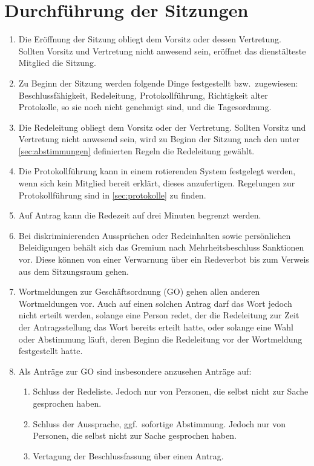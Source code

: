 \section{Durchführung der Sitzungen}
\label{sec:Sitzungen}
\begin{enumerate}
	\item Die Eröffnung der Sitzung obliegt dem Vorsitz oder dessen Vertretung.
	Sollten Vorsitz und Vertretung nicht anwesend sein, eröffnet das dienstälteste Mitglied die Sitzung.
	\item Zu Beginn der Sitzung werden folgende Dinge festgestellt bzw.\ zugewiesen: Beschlussfähigkeit, Redeleitung, Protokollführung, Richtigkeit alter Protokolle, so sie noch nicht genehmigt sind, und die Tagesordnung.
	\item Die Redeleitung obliegt dem Vorsitz oder der Vertretung.
	Sollten Vorsitz und Vertretung nicht anwesend sein, wird zu Beginn der Sitzung nach den unter \ref{sec:abstimmungen} definierten Regeln die Redeleitung gewählt.
	\item Die Protokollführung kann in einem rotierenden System festgelegt werden, wenn sich kein Mitglied bereit erklärt, dieses anzufertigen.
	Regelungen zur Protokollführung sind in \ref{sec:protokolle} zu finden.
	\item Auf Antrag kann die Redezeit auf drei Minuten begrenzt werden.
	\item Bei diskriminierenden Aussprüchen oder Redeinhalten sowie persönlichen Beleidigungen behält sich das Gremium nach Mehrheitsbeschluss Sanktionen vor.
	Diese können von einer Verwarnung über ein Redeverbot bis zum Verweis aus dem Sitzungsraum gehen.
	\item Wortmeldungen zur Geschäftsordnung (GO) gehen allen anderen Wortmeldungen vor.
	Auch auf einen solchen Antrag darf das Wort jedoch nicht erteilt werden, solange eine Person redet, der die Redeleitung zur Zeit der Antragsstellung das Wort bereits erteilt hatte, oder solange eine Wahl oder Abstimmung läuft, deren Beginn die Redeleitung vor der Wortmeldung festgestellt hatte.
	\item Als Anträge zur GO sind insbesondere anzusehen Anträge auf:
	\begin{enumerate}
		\item Schluss der Redeliste.
		Jedoch nur von Personen, die selbst nicht zur Sache gesprochen haben.
		\item Schluss der Aussprache, ggf.\ sofortige Abstimmung.
		Jedoch nur von Personen, die selbst nicht zur Sache gesprochen haben.
		\item Vertagung der Beschlussfassung über einen Antrag.

\end{enumerate}
\end{enumerate}
